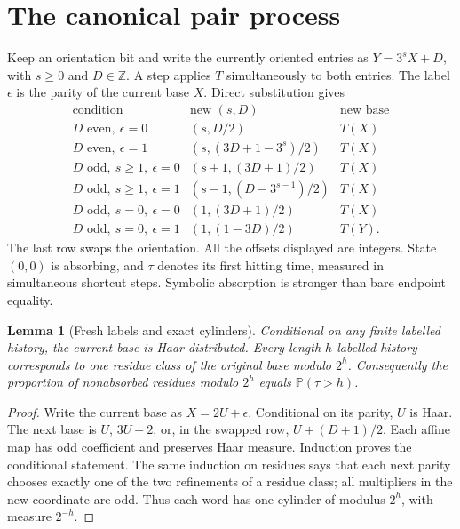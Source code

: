 \documentclass[11pt]{amsart}
\newtheorem{lemma}[theorem]{Lemma}
\theoremstyle{definition}
\theoremstyle{remark}
\newcommand{\Z}{\mathbb Z}
\newcommand{\PP}{\mathbb P}
\begin{document}
\section{The canonical pair process}\label{sec:kernel}
Keep an orientation bit and write the currently oriented entries as $Y=3^sX+D$, with $s\ge0$ and $D\in\Z$. A step applies $T$ simultaneously to both entries. The label $\epsilon$ is the parity of the current base $X$. Direct substitution gives
\[
\begin{array}{c|c|c}
\text{condition}&\text{new }(s,D)&\text{new base}\\\hline
D\text{ even},\ \epsilon=0&(s,D/2)&T(X)\\
D\text{ even},\ \epsilon=1&(s,(3D+1-3^s)/2)&T(X)\\
D\text{ odd},\ s\ge1,\ \epsilon=0&(s+1,(3D+1)/2)&T(X)\\
D\text{ odd},\ s\ge1,\ \epsilon=1&(s-1,(D-3^{s-1})/2)&T(X)\\
D\text{ odd},\ s=0,\ \epsilon=0&(1,(3D+1)/2)&T(X)\\
D\text{ odd},\ s=0,\ \epsilon=1&(1,(1-3D)/2)&T(Y).
\end{array}
\]
The last row swaps the orientation. All the offsets displayed are integers. State $(0,0)$ is absorbing, and $\tau$ denotes its first hitting time, measured in simultaneous shortcut steps. Symbolic absorption is stronger than bare endpoint equality.

\begin{lemma}[Fresh labels and exact cylinders]\label{lem:cylinders}
Conditional on any finite labelled history, the current base is Haar-distributed. Every length-$h$ labelled history corresponds to one residue class of the original base modulo $2^h$. Consequently the proportion of nonabsorbed residues modulo $2^h$ equals $\PP(\tau>h)$.
\end{lemma}
\begin{proof}
Write the current base as $X=2U+\epsilon$. Conditional on its parity, $U$ is Haar. The next base is $U$, $3U+2$, or, in the swapped row, $U+(D+1)/2$. Each affine map has odd coefficient and preserves Haar measure. Induction proves the conditional statement. The same induction on residues says that each next parity chooses exactly one of the two refinements of a residue class; all multipliers in the new coordinate are odd. Thus each word has one cylinder of modulus $2^h$, with measure $2^{-h}$.
\end{proof}
\end{document}
